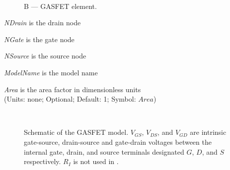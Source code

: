 \kwversions{\pspice}

\begin{figure}[h]
\centering
\ 
\caption{B --- GASFET element.
\label{b.ps}}
\end{figure}



\begin{widelist}
\item[{\it NDrain}] is the drain node
\item[{\it NGate}] is the gate node
\item[{\it NSource}] is the source node
\item[{\it ModelName}]  is  the  model name
\item[{\it Area}] is the area factor in dimensionless units\\
               (Units: none; Optional; Default: 1; Symbol: $Area$)
\end{widelist}


%
%
\label{BGASFETmodel}
\label{GASFETmodelpspice}
\begin{figure}[h]
\centering
\ \epsfxsize=2.75in
\caption[Schematic of the GASFET model]{Schematic of the GASFET model.
\label{bgasfet} $V_{GS}$, $V_{DS}$, and $V_{GD}$ are intrinsic gate-source,
drain-source and gate-drain voltages between the internal gate, drain, and
source terminals designated $G$, $D$, and $S$ respectively.
$R_I$ is not used in \pspice .}

\end{figure}
\vfill
{}


